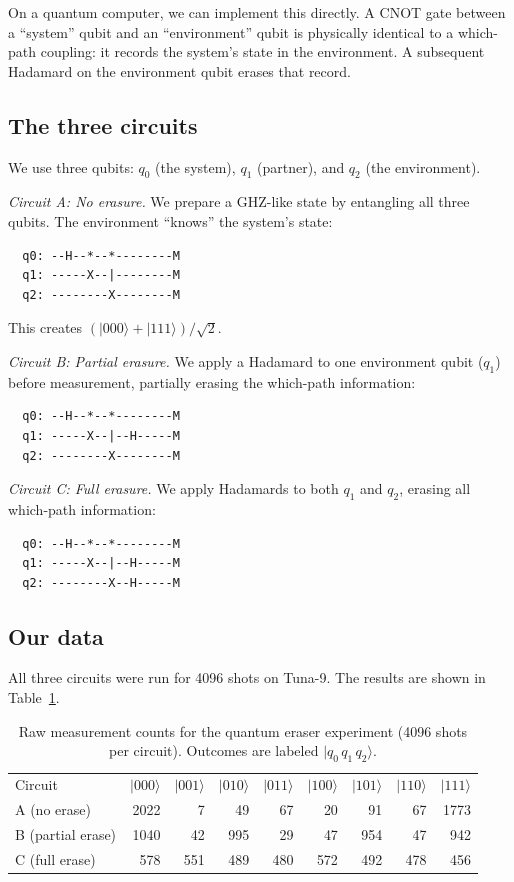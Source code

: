 \documentclass[amsmath,amssymb,reprint,aps,prb]{revtex4-2}
\newcommand{\ket}[1]{|#1\rangle}
\begin{document}
On a quantum computer, we can implement this directly.  A CNOT
gate between a ``system'' qubit and an ``environment'' qubit is
physically identical to a which-path coupling: it records the
system's state in the environment.  A subsequent Hadamard on the
environment qubit erases that record.

\subsection{The three circuits}

We use three qubits: $q_0$ (the system), $q_1$ (partner), and
$q_2$ (the environment).

\textit{Circuit A: No erasure.}  We prepare a GHZ-like state by
entangling all three qubits.  The environment ``knows'' the
system's state:
\begin{verbatim}
  q0: --H--*--*--------M
  q1: -----X--|--------M
  q2: --------X--------M
\end{verbatim}
This creates $(\ket{000} + \ket{111})/\sqrt{2}$.

\textit{Circuit B: Partial erasure.}  We apply a Hadamard to
one environment qubit ($q_1$) before measurement, partially
erasing the which-path information:
\begin{verbatim}
  q0: --H--*--*--------M
  q1: -----X--|--H-----M
  q2: --------X--------M
\end{verbatim}

\textit{Circuit C: Full erasure.}  We apply Hadamards to both
$q_1$ and $q_2$, erasing all which-path information:
\begin{verbatim}
  q0: --H--*--*--------M
  q1: -----X--|--H-----M
  q2: --------X--H-----M
\end{verbatim}

\subsection{Our data}

All three circuits were run for 4096 shots on Tuna-9.  The
results are shown in Table~\ref{tab:eraser}.

\begin{table}[t]
\caption{\label{tab:eraser}Raw measurement counts for the quantum
eraser experiment (4096 shots per circuit).  Outcomes are labeled
$\ket{q_0\,q_1\,q_2}$.}
\begin{ruledtabular}
\begin{tabular}{lrrrrrrrr}
\textrm{Circuit} & $\ket{000}$ & $\ket{001}$ & $\ket{010}$
  & $\ket{011}$ & $\ket{100}$ & $\ket{101}$ & $\ket{110}$
  & $\ket{111}$ \\
\colrule
A (no erase)       & 2022 &    7 &   49 &   67 &   20 &   91
  &   67 & 1773 \\
B (partial erase)  & 1040 &   42 &  995 &   29 &   47 &  954
  &   47 &  942 \\
C (full erase)     &  578 &  551 &  489 &  480 &  572 &  492
  &  478 &  456 \\
\end{tabular}
\end{ruledtabular}
\end{table}
\end{document}
